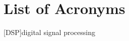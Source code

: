 \documentclass[reqno,onecolumn,oneside]{paper}
\newcommand{\<}{\ensuremath{\langle}}
\renewcommand{\>}{\ensuremath{\rangle}}
\begin{document}

%

%
%
%

\section*{List of Acronyms}
\begin{acronym}
[DSP]{digital signal processing}
\end{acronym}




\end{document}
